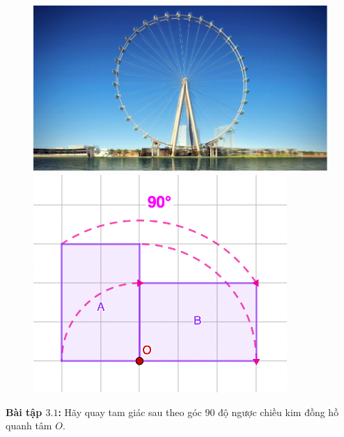 \begin{multicols}{2}
\begin{figure}[H]
		\includegraphics[width= 1\linewidth]{Picture25}
		\includegraphics[width= 1\linewidth]{Picture26}
		\vspace*{-10pt}
	\end{figure}
	\textbf{\color{toancuabi}Bài tập $\pmb{3.1}$:} Hãy quay tam giác sau theo góc $90$ độ ngược chiều kim đồng hồ quanh tâm $O$.
	\begin{figure}[H]
		\vspace*{-5pt}
		\centering
		\captionsetup{labelformat= empty, justification=centering}

\end{figure}
\end{multicols}
